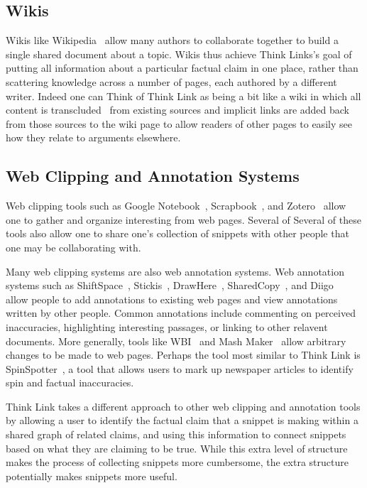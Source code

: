 \documentclass{chi2009}
\begin{document}
\subsection{Wikis}

Wikis like Wikipedia~\cite{wikipedia} allow many authors to collaborate together to build a single shared document about a topic. Wikis thus achieve Think Links's goal of putting all information about a particular factual claim in one place, rather than scattering knowledge across a number of pages, each authored by a different writer. Indeed one can Think of Think Link as being a bit like a wiki in which all content is transcluded~\cite{transclusion} from existing sources and implicit links are added back from those sources to the wiki page to allow readers of other pages to easily see how they relate to arguments elsewhere.

\subsection{Web Clipping and Annotation Systems}

Web clipping tools such as Google Notebook~\cite{googlenotebook}, Scrapbook~\cite{scrapbook}, and Zotero~\cite{zotero} allow one to gather and organize interesting from web pages. Several of Several of these tools also allow one to share one's collection of snippets with other people that one may be collaborating with. 

Many web clipping systems are also web annotation systems. Web annotation systems such as ShiftSpace~\cite{shiftspace}, Stickis~\cite{stickis}, DrawHere~\cite{drawhere}, SharedCopy~\cite{sharedcopy}, and Diigo~\cite{diigo} allow people to add annotations to existing web pages and view annotations written by other people. Common annotations include commenting on perceived inaccuracies, highlighting interesting passages, or linking to other relavent documents. More generally, tools like WBI~\cite{personalweb} and Mash Maker~\cite{mashmaker} allow arbitrary changes to be made to web pages. Perhaps the tool most similar to Think Link is SpinSpotter~\cite{spinspotter}, a tool that allows users to mark up newspaper articles to identify spin and factual inaccuracies.

Think Link takes a different approach to other web clipping and annotation tools by allowing a user to identify the factual claim that a snippet is making within a shared graph of related claims, and using this information to connect snippets based on what they are claiming to be true. While this extra level of structure makes the process of collecting snippets more cumbersome, the extra structure potentially makes snippets more useful.
\end{document}
